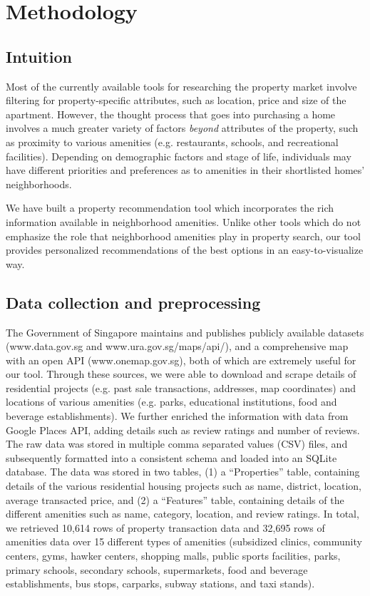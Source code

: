 \documentclass[a4paper, 11pt]{article}
\begin{document}
	\section{Methodology}
	
	\subsection{Intuition}
	
	Most of the currently available tools for researching the property market involve filtering for property-specific attributes, such as location, price and size of the apartment. However, the thought process that goes into purchasing a home involves a much greater variety of factors \textit{beyond} attributes of the property, such as proximity to various amenities (e.g. restaurants, schools, and recreational facilities). Depending on demographic factors and stage of life, individuals may have different priorities and preferences as to amenities in their shortlisted homes' neighborhoods.
	
	We have built a property recommendation tool which incorporates the rich information available in neighborhood amenities. Unlike other tools which do not emphasize the role that neighborhood amenities play in property search, our tool provides personalized recommendations of the best options in an easy-to-visualize way.
	
	\subsection{Data collection and preprocessing}
	
	The Government of Singapore maintains and publishes publicly available datasets (www.data.gov.sg and www.ura.gov.sg/maps/api/), and a comprehensive map with an open API (www.onemap.gov.sg), both of which are extremely useful for our tool. Through these sources, we were able to download and scrape details of residential projects (e.g. past sale transactions, addresses, map coordinates) and locations of various amenities (e.g. parks, educational institutions, food and beverage establishments). We further enriched the information with data from Google Places API, adding details such as review ratings and number of reviews. The raw data was stored in multiple comma separated values (CSV) files, and subsequently formatted into a consistent schema and loaded into an SQLite database. The data was stored in two tables, (1) a “Properties” table, containing details of the various residential housing projects such as name, district, location, average transacted price, and (2) a “Features” table, containing details of the different amenities such as name, category, location, and review ratings. In total, we retrieved 10,614 rows of property transaction data and 32,695 rows of amenities data over 15 different types of amenities (subsidized clinics, community centers, gyms, hawker centers, shopping malls, public sports facilities, parks, primary schools, secondary schools, supermarkets, food and beverage establishments, bus stops, carparks, subway stations, and taxi stands).
\end{document}

